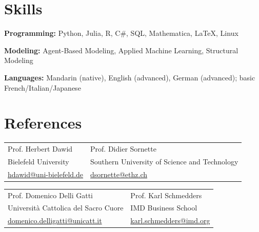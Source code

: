 \documentclass[a4paper,11pt]{article}
\begin{document}
\section{Skills}

\textbf{Programming:} Python, Julia, R, C\#, SQL, Mathematica, \LaTeX, Linux  

\textbf{Modeling:} Agent-Based Modeling, Applied Machine Learning, Structural Modeling  

\textbf{Languages:} Mandarin (native), English (advanced), German (advanced); basic French/Italian/Japanese

\section{References}

\begin{tabularx}{\linewidth}{X X}
Prof. Herbert Dawid & Prof. Didier Sornette \\
Bielefeld University & Southern University of Science and Technology \\
\href{mailto:hdawid@uni-bielefeld.de}{hdawid@uni-bielefeld.de} &
\href{mailto:dsornette@ethz.ch}{dsornette@ethz.ch}
\end{tabularx}

\vspace{6pt}

\begin{tabularx}{\linewidth}{X X}
Prof. Domenico Delli Gatti & Prof. Karl Schmedders \\
Università Cattolica del Sacro Cuore & IMD Business School \\
\href{mailto:domenico.delligatti@unicatt.it}{domenico.delligatti@unicatt.it} &
\href{mailto:karl.schmedders@imd.org}{karl.schmedders@imd.org}
\end{tabularx}
\end{document}
